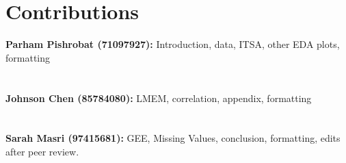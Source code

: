 \documentclass[
]{article}
\begin{document}
\pagebreak

\hypertarget{contributions}{%
\section{Contributions}\label{contributions}}

\textbf{Parham Pishrobat (71097927):} Introduction, data, ITSA, other EDA plots, formatting\\ \\ \\
\textbf{Johnson Chen (85784080):}  \quad LMEM, correlation, appendix, formatting\\ \\ \\
\textbf{Sarah Masri (97415681):} \quad \quad GEE, Missing Values, conclusion, formatting, edits after peer review.\\ \\ \\
\end{document}
